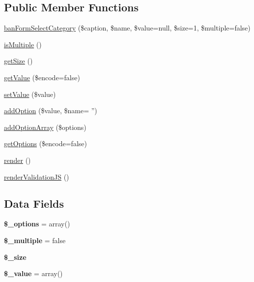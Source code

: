 \subsection*{Public Member Functions}
\begin{DoxyCompactItemize}
\item 
\hyperlink{classban_form_select_category_a1abd294037fdeec924c7e7c4d8811fe8}{ban\-Form\-Select\-Category} (\$caption, \$name, \$value=null, \$size=1, \$multiple=false)
\item 
\hyperlink{classban_form_select_category_ac5d76ccb2e931e4abb4456d6ad492ac1}{is\-Multiple} ()
\item 
\hyperlink{classban_form_select_category_a75cce10cdf81be6dc84881c28b3379b7}{get\-Size} ()
\item 
\hyperlink{classban_form_select_category_ab3c79e314dfd09da4de90fb2ce5eaa9d}{get\-Value} (\$encode=false)
\item 
\hyperlink{classban_form_select_category_a7494441b6ed08a391704971873f31432}{set\-Value} (\$value)
\item 
\hyperlink{classban_form_select_category_ac485d7f4f2160de8fb47aa29aeed7080}{add\-Option} (\$value, \$name= '')
\item 
\hyperlink{classban_form_select_category_a673ec8d6dc3cc0ee2f62fbe1c824ccc5}{add\-Option\-Array} (\$options)
\item 
\hyperlink{classban_form_select_category_ac15eda2814c8ff0477244b28a315fb5a}{get\-Options} (\$encode=false)
\item 
\hyperlink{classban_form_select_category_afde88292c44dc59faf017738dae6dffb}{render} ()
\item 
\hyperlink{classban_form_select_category_a2747262e7fc6aba84bfc52bcf38407df}{render\-Validation\-J\-S} ()
\end{DoxyCompactItemize}
\subsection*{Data Fields}
\begin{DoxyCompactItemize}
\item 
\hypertarget{classban_form_select_category_a1bebdc689c84eee59ad24c77e5531762}{{\bfseries \$\-\_\-options} = array()}\label{classban_form_select_category_a1bebdc689c84eee59ad24c77e5531762}

\item 
\hypertarget{classban_form_select_category_acae132bb5063b7d542ea6a0be0ae22f2}{{\bfseries \$\-\_\-multiple} = false}\label{classban_form_select_category_acae132bb5063b7d542ea6a0be0ae22f2}

\item 
\hypertarget{classban_form_select_category_a3f3a27f0a14f4760227dbc5ae3288681}{{\bfseries \$\-\_\-size}}\label{classban_form_select_category_a3f3a27f0a14f4760227dbc5ae3288681}

\item 
\hypertarget{classban_form_select_category_a599c02a4727030b8ecc632f7c8adafeb}{{\bfseries \$\-\_\-value} = array()}\label{classban_form_select_category_a599c02a4727030b8ecc632f7c8adafeb}

\end{DoxyCompactItemize}


